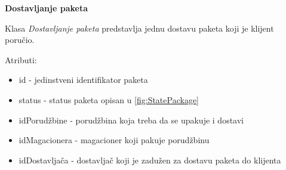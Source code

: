 \textbf{\large Dostavljanje paketa}
\vspace{0.3cm}

Klasa \textit{Dostavljanje paketa} predstavlja jednu dostavu paketa  koji je klijent poručio.

Atributi:
\begin{itemize}
    \item id - jedinstveni identifikator paketa
    \item status - status paketa opisan u \ref{fig:StatePackage}
    \item idPorudžbine - porudžbina koja treba da se upakuje i dostavi
    \item idMagacionera - magacioner koji pakuje porudžbinu
    \item idDostavljača - dostavljač koji je zadužen za dostavu paketa do klijenta
\end{itemize}